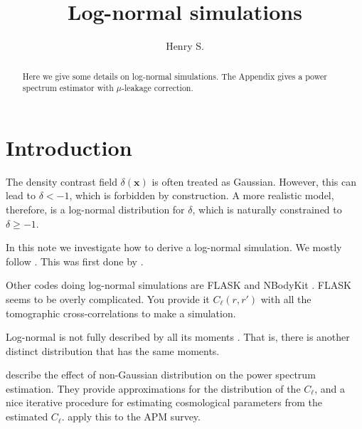 \documentclass[aps,prd,reprint,floatfix,superscriptaddress,showkeys,nofootinbib]{revtex4-1}
\def\vx{{\bm{x}}}
\begin{document}
\title{Log-normal simulations}

\author{Henry S. }


\begin{abstract}
  Here we give some details on log-normal simulations. The Appendix gives a
  power spectrum estimator with $\mu$-leakage correction.
\end{abstract}



\maketitle
\tableofcontents


\section{Introduction}
The density contrast field $\delta(\vx)$ is often treated as Gaussian. However,
this can lead to $\delta<-1$, which is forbidden by construction. A more
realistic model, therefore, is a log-normal distribution for $\delta$, which is
naturally constrained to $\delta\geq-1$.

In this note we investigate how to derive a log-normal simulation. We
mostly follow \citet{Agrawal+:2017JCAP...10..003A}. This was first done by
\citet{Coles+:1991MNRAS.248....1C}.

Other codes doing log-normal simulations are FLASK
\citep{Xavier+:2016MNRAS.459.3693X} and NBodyKit
\citep{Hand+:2017JCAP...07..002H}. FLASK seems to be overly complicated. You
provide it $C_\ell(r,r')$ with all the tomographic cross-correlations to make a
simulation.

Log-normal is not fully described by all its moments
\citep{Coles+:1991MNRAS.248....1C}. That is, there is another distinct
distribution that has the same moments.

\citet{Bond+:2000ApJ...533...19B} describe the effect of non-Gaussian
distribution on the power spectrum estimation. They provide approximations for
the distribution of the $C_\ell$, and a nice iterative procedure for estimating
cosmological parameters from the estimated $C_\ell$.
\citet{Efstathiou+:2001MNRAS.325.1603E} apply this to the APM survey.
\end{document}
